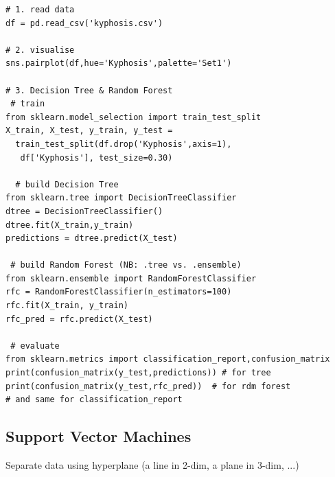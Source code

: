 \documentclass[12pt]{article}
\begin{document}
\begin{lstlisting}
# 1. read data
df = pd.read_csv('kyphosis.csv')

# 2. visualise 
sns.pairplot(df,hue='Kyphosis',palette='Set1')

# 3. Decision Tree & Random Forest
 # train
from sklearn.model_selection import train_test_split
X_train, X_test, y_train, y_test = 
  train_test_split(df.drop('Kyphosis',axis=1),
   df['Kyphosis'], test_size=0.30)
  
  # build Decision Tree
from sklearn.tree import DecisionTreeClassifier
dtree = DecisionTreeClassifier()
dtree.fit(X_train,y_train)
predictions = dtree.predict(X_test)

 # build Random Forest (NB: .tree vs. .ensemble)
from sklearn.ensemble import RandomForestClassifier
rfc = RandomForestClassifier(n_estimators=100)
rfc.fit(X_train, y_train)
rfc_pred = rfc.predict(X_test)

 # evaluate
from sklearn.metrics import classification_report,confusion_matrix
print(confusion_matrix(y_test,predictions)) # for tree
print(confusion_matrix(y_test,rfc_pred))  # for rdm forest
# and same for classification_report
\end{lstlisting}

\subsection{Support Vector Machines}
Separate data using hyperplane (a line in 2-dim, a plane in 3-dim, ...)
\end{document}
